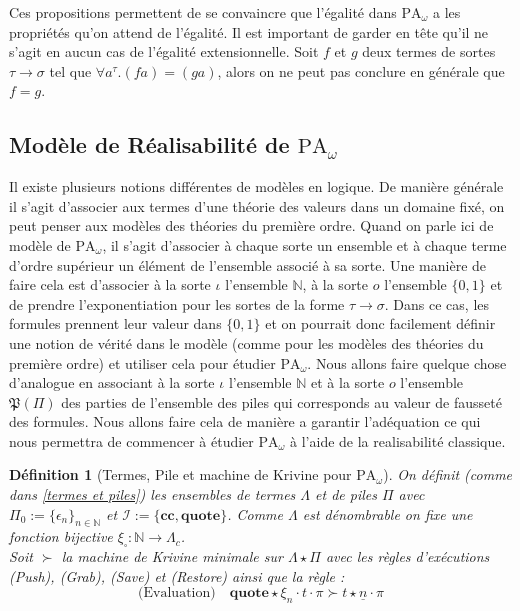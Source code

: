 \documentclass[a4paper,12pt]{article}
\newtheorem{defi}[theo]{Définition}
\theoremstyle{rmqstyle}
\newcommand{\N}{\mathbb{N}}
\newcommand{\set}[1]{\{#1\}}
\newcommand{\PA}{\mathrm{PA}}
\renewcommand{\P}{\mathfrak{P}}
\newcommand{\cc}{\mathbf{cc}}
\newcommand{\Kri}[1]{\underline{#1}}
\begin{document}
Ces propositions permettent de se convaincre que l'égalité dans $\PA_\omega$ a les propriétés qu'on attend de l'égalité. Il est important de garder en tête qu'il ne s'agit en aucun cas de l'égalité extensionnelle. Soit $f$ et $g$ deux termes de sortes $\tau \to \sigma$ tel que $\forall a^\tau. (fa) = (ga)$, alors on ne peut pas conclure en générale que $f = g$. 

\clearpage
\subsection{Modèle de Réalisabilité de \( \PA_\omega \)}

Il existe plusieurs notions différentes de modèles en logique. De manière générale il s'agit d'associer aux termes d'une théorie des valeurs dans un domaine fixé, on peut penser aux modèles des théories du première ordre. Quand on parle ici de modèle de $\PA_\omega$, il s'agit d'associer à chaque sorte un ensemble et à chaque terme d'ordre supérieur un élément de l'ensemble associé à sa sorte. Une manière de faire cela est d'associer à la sorte $\iota$ l'ensemble $\N$, à la sorte $o$ l'ensemble $\set{0,1}$ et de prendre l'exponentiation  pour les sortes de la forme $\tau \to \sigma$. Dans ce cas, les formules prennent leur valeur dans $\set{0,1}$ et on pourrait donc facilement définir une notion de vérité dans le modèle (comme pour les modèles des théories du première ordre) et utiliser cela pour étudier $\PA_\omega$. Nous allons faire quelque chose d'analogue en associant à la sorte $\iota$ l'ensemble $\N$ et à la sorte $o$ l'ensemble $\P(\Pi)$ des parties de l'ensemble des piles qui corresponds au valeur de fausseté des formules. Nous allons faire cela de manière a garantir l'adéquation ce qui nous permettra de commencer à étudier $\PA_\omega$ à l'aide de la realisabilité classique. 

\begin{defi}[Termes, Pile et machine de Krivine pour $\PA_\omega$]
On définit (comme dans \ref{termes et piles}) les ensembles de termes $\Lambda$ et de piles $\Pi$ avec $\Pi_0 := \set{\epsilon_n}_{n \in \N}$ et $\mathcal{I} := \set{\cc, \mathbf{quote}}$. Comme $\Lambda$ est dénombrable on fixe une fonction bijective $\xi_{\square} : \N \to \Lambda_c$.\\
Soit $\succ$ la machine de Krivine minimale sur $\Lambda \star \Pi$ avec les règles d'exécutions \textit{(Push)}, \textit{(Grab)}, \textit{(Save)} et \textit{(Restore)} ainsi que la règle :
$$\text{(Evaluation)} \quad \mathbf{quote} \star \xi_n \cdot t \cdot \pi \succ t \star \Kri{n} \cdot \pi$$
\end{defi}
\end{document}
